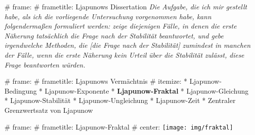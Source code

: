 # frame:
  # frametitle: Ljapunows Dissertation
  \emph{%
    \glqq
    Die Aufgabe, die ich mir gestellt habe, als ich die vorliegende Untersuchung vorgenommen habe,
    kann folgendermaßen formuliert werden: zeige diejenigen Fälle, in denen die erste Näherung
    tatsächlich die Frage nach der Stabilität beantwortet, und gebe irgendwelche Methoden,
    die [die Frage nach der Stabilität] zumindest in manchen der Fälle,
    wenn die erste Näherung kein Urteil über die Stabilität zulässt,
    diese Frage beantworten würden.%
    \grqq
  }

# frame:
  # frametitle: Ljapunows Vermächtnis
  # itemize:
    * Ljapunow-Bedingung
    * Ljapunow-Exponente
    * \textbf{Ljapunow-Fraktal}
    * Ljapunow-Gleichung
    * Ljapunow-Stabilität
    * Ljapunow-Ungleichung
    * Ljapunow-Zeit
    * Zentraler Grenzwertsatz von Ljapunow

# frame:
  # frametitle: Ljapunow-Fraktal
  # center:
    \texttt{[image: img/fraktal]}
